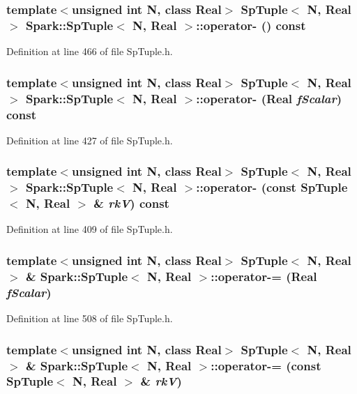 \subsubsection{\setlength{\rightskip}{0pt plus 5cm}template$<$unsigned int N, class Real$>$ {\bf Sp\-Tuple}$<$ N, Real $>$ {\bf Spark::Sp\-Tuple}$<$ N, Real $>$::operator- () const}\label{classSpark_1_1SpTuple_a21}


Definition at line 466 of file Sp\-Tuple.h.
\subsubsection{\setlength{\rightskip}{0pt plus 5cm}template$<$unsigned int N, class Real$>$ {\bf Sp\-Tuple}$<$ N, Real $>$ {\bf Spark::Sp\-Tuple}$<$ N, Real $>$::operator- (Real {\em f\-Scalar}) const}\label{classSpark_1_1SpTuple_a18}


Definition at line 427 of file Sp\-Tuple.h.
\subsubsection{\setlength{\rightskip}{0pt plus 5cm}template$<$unsigned int N, class Real$>$ {\bf Sp\-Tuple}$<$ N, Real $>$ {\bf Spark::Sp\-Tuple}$<$ N, Real $>$::operator- (const {\bf Sp\-Tuple}$<$ N, Real $>$ \& {\em rk\-V}) const}\label{classSpark_1_1SpTuple_a16}


Definition at line 409 of file Sp\-Tuple.h.
\subsubsection{\setlength{\rightskip}{0pt plus 5cm}template$<$unsigned int N, class Real$>$ {\bf Sp\-Tuple}$<$ N, Real $>$ \& {\bf Spark::Sp\-Tuple}$<$ N, Real $>$::operator-= (Real {\em f\-Scalar})}\label{classSpark_1_1SpTuple_a25}


Definition at line 508 of file Sp\-Tuple.h.
\subsubsection{\setlength{\rightskip}{0pt plus 5cm}template$<$unsigned int N, class Real$>$ {\bf Sp\-Tuple}$<$ N, Real $>$ \& {\bf Spark::Sp\-Tuple}$<$ N, Real $>$::operator-= (const {\bf Sp\-Tuple}$<$ N, Real $>$ \& {\em rk\-V})}\label{classSpark_1_1SpTuple_a23}


